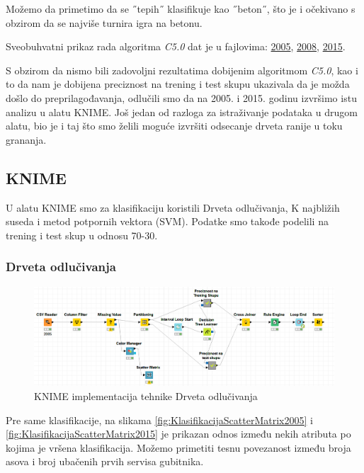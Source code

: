 \documentclass[a4paper]{article}
\begin{document}
Možemo da primetimo da se ˝tepih˝ klasifikuje kao ˝beton˝, što je i očekivano s obzirom da se najviše turnira igra na betonu. 

Sveobuhvatni prikaz rada algoritma \textit{C5.0} dat je u fajlovima: \href{file:./Klasifikacija/C50/Summary_Surface2005.html}{2005}, \href{file:./Klasifikacija/C50/Summary_Surface2008.html}{2008}, \href{file:./Klasifikacija/C50/Summary_Surface2005.html}{2015}.  

S obzirom da nismo bili zadovoljni rezultatima dobijenim algoritmom \textit{C5.0}, kao i to da nam je dobijena preciznost na trening i test skupu ukazivala da je možda došlo do preprilagođavanja, odlučili smo da na 2005. i 2015. godinu izvršimo istu analizu u alatu KNIME. Još jedan od razloga za istraživanje podataka u drugom alatu, bio je i taj što smo želili moguće izvršiti odsecanje drveta ranije u toku grananja.

\subsection{KNIME}

U alatu KNIME smo za klasifikaciju koristili Drveta odlučivanja, K najbližih suseda i metod potpornih vektora (SVM). Podatke smo takođe podelili na trening i test skup u odnosu 70-30.

\subsubsection{Drveta odlučivanja}

\begin{figure}[H]
	\begin{center}
		\includegraphics[width=\textwidth]{Klasifikacija/DrvoOdlucivanja/KNIME_DrvoOdlucivanjaCvorovi.png}
	\end{center}
	\caption{KNIME implementacija tehnike Drveta odlučivanja}
	\label{fig:KNIME_CvoroviKlasifikacija}
\end{figure}

Pre same klasifikacije, na slikama \ref{fig:KlasifikacijaScatterMatrix2005} i \ref{fig:KlasifikacijaScatterMatrix2015} je prikazan odnos između nekih atributa po kojima je vršena klasifikacija. Možemo primetiti tesnu povezanost između broja asova i broj ubačenih prvih servisa gubitnika. 
\end{document}

